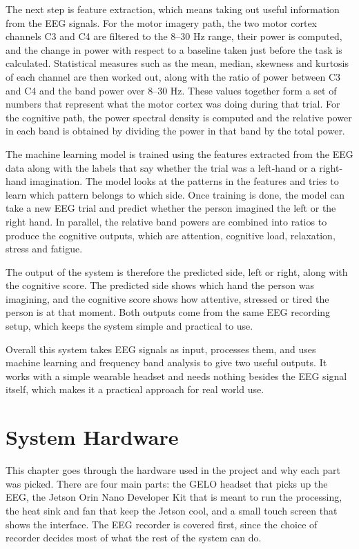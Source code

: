 The next step is feature extraction, which means taking out useful information from the
EEG signals. For the motor imagery path, the two motor cortex channels C3 and C4 are
filtered to the 8--30 Hz range, their power is computed, and the change in power with
respect to a baseline taken just before the task is calculated. Statistical measures such
as the mean, median, skewness and kurtosis of each channel are then worked out, along with
the ratio of power between C3 and C4 and the band power over 8--30 Hz. These values
together form a set of numbers that represent what the motor cortex was doing during that
trial. For the cognitive path, the power spectral density is computed and the relative
power in each band is obtained by dividing the power in that band by the total power.

The machine learning model is trained using the features extracted from the EEG data along
with the labels that say whether the trial was a left-hand or a right-hand imagination. The
model looks at the patterns in the features and tries to learn which pattern belongs to
which side. Once training is done, the model can take a new EEG trial and predict whether
the person imagined the left or the right hand. In parallel, the relative band powers are
combined into ratios to produce the cognitive outputs, which are attention, cognitive load,
relaxation, stress and fatigue.

The output of the system is therefore the predicted side, left or right, along with the
cognitive score. The predicted side shows which hand the person was imagining, and the
cognitive score shows how attentive, stressed or tired the person is at that moment. Both
outputs come from the same EEG recording setup, which keeps the system simple and practical
to use.

Overall this system takes EEG signals as input, processes them, and uses machine learning
and frequency band analysis to give two useful outputs. It works with a simple wearable
headset and needs nothing besides the EEG signal itself, which makes it a practical
approach for real world use.


\chapter{System Hardware}
This chapter goes through the hardware used in the project and why each part was picked.
There are four main parts: the GELO headset that picks up the EEG, the Jetson Orin Nano
Developer Kit that is meant to run the processing, the heat sink and fan that keep the
Jetson cool, and a small
touch screen that shows the interface. The EEG recorder is covered first, since the choice
of recorder decides most of what the rest of the system can do.

